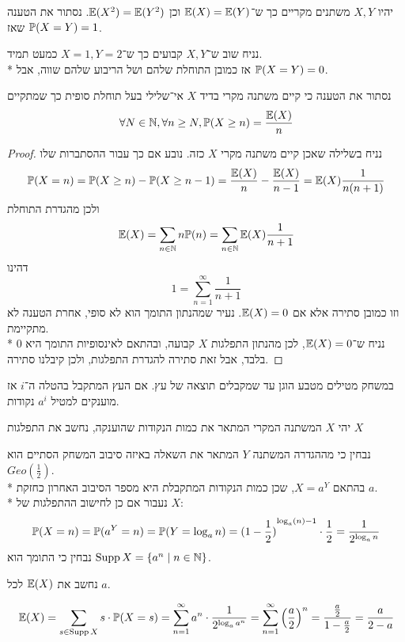 \subquestion{}
יהיו $X, Y$ משתנים מקריים כך ש־$\mathbb{E}(X) = \mathbb{E}(Y)$ וכן $\mathbb{E}(X^2) = \mathbb{E}(Y^2)$.
נסתור את הטענה שאז $\mathbb{P}(X = Y) = 1$.
\begin{solution}
	נניח שוב ש־$X, Y$ קבועים כך ש־$X = 1, Y = 2$ כמעט תמיד. \\*
	אז כמובן התוחלת שלהם ושל הריבוע שלהם שווה, אבל $\mathbb{P}(X = Y) = 0$.
\end{solution}

\subquestion{}
נסתור את הטענה כי קיים משתנה מקרי בדיד $X$ אי־שלילי בעל תוחלת סופית כך שמתקיים
\[
	\forall N \in \mathbb{N}, \forall n \ge N, \mathbb{P}(X \ge n) = \frac{\mathbb{E}(X)}{n}
\]
\begin{proof}
	נניח בשלילה שאכן קיים משתנה מקרי $X$ כזה.
	נובע אם כך עבור ההסתברות שלו
	\[
		\mathbb{P}(X = n)
		= \mathbb{P}(X \ge n) - \mathbb{P}(X \ge n - 1)
		= \frac{\mathbb{E}(X)}{n} - \frac{\mathbb{E}(X)}{n - 1}
		= \mathbb{E}(X) \frac{1}{n(n + 1)}
	\]
	ולכן מהגדרת התוחלת
	\[
		\mathbb{E}(X)
		= \sum_{n \in \mathbb{N}} n \mathbb{P}(n)
		= \sum_{n \in \mathbb{N}} \mathbb{E}(X) \frac{1}{n + 1}
	\]
	דהינו
	\[
		1 = \sum_{n = 1}^{\infty} \frac{1}{n + 1}
	\]
	וזו כמובן סתירה אלא אם $\mathbb{E}(X) = 0$. נעיר שמהנתון התומך הוא לא סופי, אחרת הטענה לא מתקיימת. \\*
	נניח ש־$\mathbb{E}(X) = 0$, לכן מהנתון התפלגות $X$ קבועה, ובהתאם לאינסופיות התומך היא 0 בלבד, אבל זאת סתירה להגדרת התפלגות, ולכן קיבלנו סתירה.
\end{proof}

\question{}
במשחק מטילים מטבע הוגן עד שמקבלים תוצאה של עץ. אם העץ המתקבל בהטלה ה־$i$ אז מוענקים למטיל $a^i$ נקודות.

\subquestion{}
יהי $X$ המשתנה המקרי המתאר את כמות הנקודות שהוענקה, נחשב את התפלגות $X$
\begin{solution}
	נבחין כי מההגדרה המשתנה $Y$ המתאר את השאלה באיזה סיבוב המשחק הסתיים הוא $Geo(\frac{1}{2})$. \\*
	בהתאם $X = a^Y$, שכן כמות הנקודות המתקבלת היא מספר הסיבוב האחרון כחזקת $a$. \\*
	נעבור אם כן לחישוב ההתפלגות של $X$:
	\[
		\mathbb{P}(X = n)
		= \mathbb{P}(a^Y = n)
		= \mathbb{P}(Y = \log_a n)
		= {(1 - \frac{1}{2})}^{\log_a(n) - 1} \cdot \frac{1}{2}
		= \frac{1}{2^{\log_a n}}
	\]
	נבחין כי התומך הוא $\operatorname{Supp} X = \{ a^n \mid n \in \mathbb{N} \}$.
\end{solution}

\subquestion{}
נחשב את $\mathbb{E}(X)$ לכל $a$.
\begin{solution}
	\[
		\mathbb{E}(X)
		= \sum_{s \in \operatorname{Supp} X} s \cdot \mathbb{P}(X = s)
		= \sum_{n = 1}^\infty a^n \cdot \frac{1}{2^{\log_a a^n}}
		= \sum_{n = 1}^\infty {\left(\frac{a}{2}\right)}^n
		= \frac{\frac{a}{2}}{1 - \frac{a}{2}}
		= \frac{a}{2 - a}
	\]
\end{solution}


